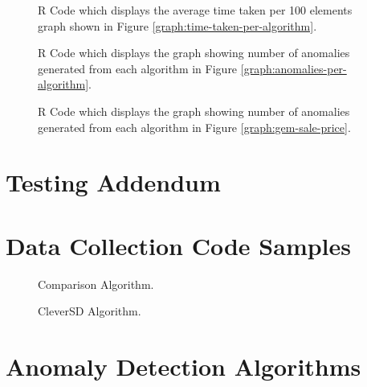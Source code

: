 \documentclass[journal]{IEEEtran}
\begin{document}
\begin{appendices}
    
    \begin{figure}[hbt!]
        \caption{R Code which displays the average time taken per 100 elements graph shown in Figure \ref{graph:time-taken-per-algorithm}.}
        \label{algorithm:r-time-taken-per-element}
    \end{figure}

    
    \begin{figure}[hbt!]
        \caption{R Code which displays the graph showing number of anomalies generated from each algorithm in Figure \ref{graph:anomalies-per-algorithm}.}
        \label{algorithm:r-anomalies-per-algorithm}
    \end{figure}

    
    \begin{figure}[hbt!]
        \caption{R Code which displays the graph showing number of anomalies generated from each algorithm in Figure \ref{graph:gem-sale-price}.}
        \label{algorithm:r-gem-sale-price}
    \end{figure}

    \section{Testing Addendum}
    \label{appendix:testing-addendum}

    \section{Data Collection Code Samples}
    \label{appendix:collection-code}
    
    
    \begin{figure}[hbt!]
        \caption{Comparison Algorithm.}
        \label{algorithm:algorithm-comparison}
    \end{figure}

    
    \begin{figure}[hbt!]
        \caption{CleverSD Algorithm.}
        \label{algorithm:clever-sd}
    \end{figure}

    \section{Anomaly Detection Algorithms}
    \label{appendix:detection-code}
    

\end{appendices}
\end{document}

